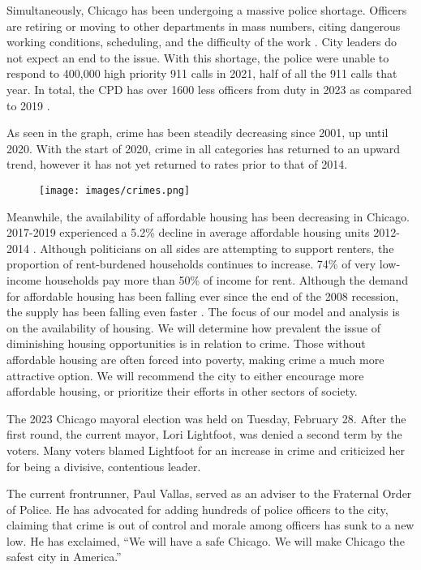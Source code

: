 \documentclass{article}
\begin{document}
\begin{onehalfspacing}
Simultaneously, Chicago has been undergoing a massive police shortage. Officers are retiring or moving to other departments in mass numbers, citing dangerous working conditions, scheduling, and the difficulty of the work \cite{cbs-policing}. City leaders do not expect an end to the issue. With this shortage, the police were unable to respond to 400,000 high priority 911 calls in 2021, half of all the 911 calls that year. In total, the CPD has over 1600 less officers from duty in 2023 as compared to 2019 \cite{CPD-staffing}.

As seen in the graph, crime has been steadily decreasing since 2001, up until 2020. With the start of 2020, crime in all categories has returned to an upward trend, however it has not yet returned to rates prior to that of 2014.

\begin{figure}
    \centering
    \centerline{\texttt{[image: images/crimes.png]}}
\end{figure}

Meanwhile, the availability of affordable housing has been decreasing in Chicago. 2017-2019 experienced a 5.2\% decline in average affordable housing units 2012-2014 \cite{aff-housing-dec}. Although politicians on all sides are attempting to support renters, the proportion of rent-burdened households continues to increase. 74\% of very low-income households pay more than 50\% of income for rent. Although the demand for affordable housing has been falling ever since the end of the 2008 recession, the supply has been falling even faster \cite{aff-housing}. The focus of our model and analysis is on the availability of housing. We will determine how prevalent the issue of diminishing housing opportunities is in relation to crime. Those without affordable housing are often forced into poverty, making crime a much more attractive option. We will recommend the city to either encourage more affordable housing, or prioritize their efforts in other sectors of society.

The 2023 Chicago mayoral election was held on Tuesday, February 28. After the first round, the current mayor, Lori Lightfoot, was denied a second term by the voters. Many voters blamed Lightfoot for an increase in crime and criticized her for being a divisive, contentious leader.

The current frontrunner, Paul Vallas, served as an adviser to the Fraternal Order of Police. He has advocated for adding hundreds of police officers to the city, claiming that crime is out of control and morale among officers has sunk to a new low. He has exclaimed, “We will have a safe Chicago. We will make Chicago the safest city in America.”


\end{onehalfspacing}
\end{document}
